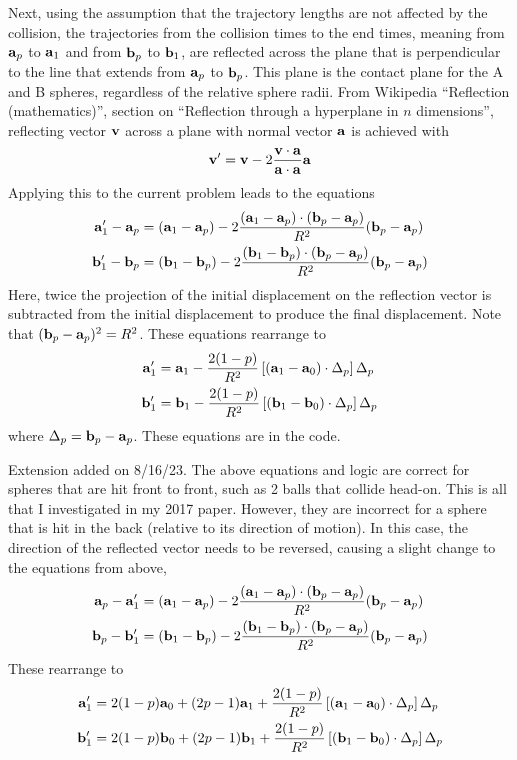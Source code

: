 \documentclass[11pt]{article}
\begin{document}
\begin{description}
Next, using the assumption that the trajectory lengths are not affected by the collision, the trajectories from the collision times to the end times, meaning from $\vb{a}_p$ to $\vb{a}_1$ and from $\vb{b}_p$ to $\vb{b}_1$, are reflected across the plane that is perpendicular to the line that extends from $\vb{a}_p$ to $\vb{b}_p$. This plane is the contact plane for the A and B spheres, regardless of the relative sphere radii. From Wikipedia ``Reflection (mathematics)'', section on ``Reflection through a hyperplane in $n$ dimensions'', reflecting vector $\vb{v}$ across a plane with normal vector $\vb{a}$ is achieved with
$$\vb{v}' = \vb{v} - 2\frac{\vb{v}\cdot\vb{a}}{\vb{a}\cdot\vb{a}}\vb{a}$$
Applying this to the current problem leads to the equations
\begin{align*}
\vb{a}_1' - \vb{a}_p &= (\vb{a}_1 - \vb{a}_p) - 2 \frac{(\vb{a}_1 - \vb{a}_p)\cdot (\vb{b}_p - \vb{a}_p)}{R^2} (\vb{b}_p - \vb{a}_p) \\
\vb{b}_1' - \vb{b}_p &= (\vb{b}_1 - \vb{b}_p) - 2 \frac{(\vb{b}_1 - \vb{b}_p)\cdot (\vb{b}_p - \vb{a}_p)}{R^2} (\vb{b}_p - \vb{a}_p)
\end{align*}
Here, twice the projection of the initial displacement on the reflection vector is subtracted from the initial displacement to produce the final displacement. Note that $(\vb{b}_p - \vb{a}_p)^2 = R^2$. These equations rearrange to
\begin{align*}
\vb{a}_1' &= \vb{a}_1 - \frac{2(1-p)}{R^2} \left[(\vb{a}_1 - \vb{a}_0)\cdot \Delta_p \right] \Delta_p \\
\vb{b}_1' &= \vb{b}_1 - \frac{2(1-p)}{R^2} \left[(\vb{b}_1 - \vb{b}_0)\cdot \Delta_p \right] \Delta_p
\end{align*}
where $\Delta_p = \vb{b}_p - \vb{a}_p$. These equations are in the code.

Extension added on 8/16/23. The above equations and logic are correct for spheres that are hit front to front, such as 2 balls that collide head-on. This is all that I investigated in my 2017 paper. However, they are incorrect for a sphere that is hit in the back (relative to its direction of motion). In this case, the direction of the reflected vector needs to be reversed, causing a slight change to the equations from above,
\begin{align*}
\vb{a}_p - \vb{a}_1' &= (\vb{a}_1 - \vb{a}_p) - 2 \frac{(\vb{a}_1 - \vb{a}_p)\cdot (\vb{b}_p - \vb{a}_p)}{R^2} (\vb{b}_p - \vb{a}_p) \\
\vb{b}_p - \vb{b}_1' &= (\vb{b}_1 - \vb{b}_p) - 2 \frac{(\vb{b}_1 - \vb{b}_p)\cdot (\vb{b}_p - \vb{a}_p)}{R^2} (\vb{b}_p - \vb{a}_p)
\end{align*}
These rearrange to
\begin{align*}
\vb{a}_1' &= 2(1-p)\vb{a}_0 + (2p-1)\vb{a}_1 + \frac{2(1-p)}{R^2} \left[(\vb{a}_1 - \vb{a}_0)\cdot \Delta_p \right] \Delta_p \\
\vb{b}_1' &= 2(1-p)\vb{b}_0 + (2p-1)\vb{b}_1 + \frac{2(1-p)}{R^2} \left[(\vb{b}_1 - \vb{b}_0)\cdot \Delta_p \right] \Delta_p
\end{align*}


\end{description}
\end{document}
